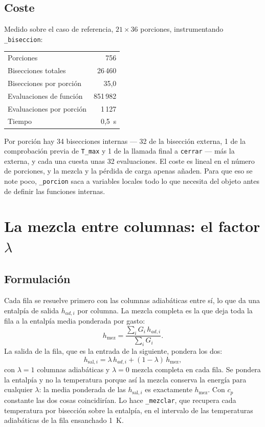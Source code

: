 \documentclass[11pt,a4paper]{article}
\begin{document}
\subsection{Coste}
\label{sec:coste}

Medido sobre el caso de referencia, $21\times36$ porciones, instrumentando
\texttt{\_biseccion}:

\begin{center}
\begin{tabular}{lr}
  \toprule
  Porciones                                  & 756 \\
  Bisecciones totales                        & 26\,460 \\
  Bisecciones por porción                    & 35,0 \\
  Evaluaciones de función                    & 851\,982 \\
  Evaluaciones por porción                   & 1\,127 \\
  Tiempo                                     & 0,5~s \\
  \bottomrule
\end{tabular}
\end{center}

Por porción hay 34 bisecciones internas --- 32 de la bisección externa, 1 de la
comprobación previa de \texttt{T\_max} y 1 de la llamada final a \texttt{cerrar}
--- más la externa, y cada una cuesta unas 32 evaluaciones. El coste es lineal
en el número de porciones, y la mezcla y la pérdida de carga apenas añaden. Para
que eso se note poco, \texttt{\_porcion} saca a variables locales todo lo que
necesita del objeto antes de definir las funciones internas.

\section{La mezcla entre columnas: el factor \texorpdfstring{$\lambda$}{lambda}}
\label{sec:mezcla}

\subsection{Formulación}

Cada fila se resuelve primero con las columnas adiabáticas entre sí, lo que da
una entalpía de salida $h_{ad,i}$ por columna. La mezcla completa es la que deja
toda la fila a la entalpía media ponderada por gasto:
\[
  h_{\mathrm{mez}} = \frac{\sum_i G_i\,h_{ad,i}}{\sum_i G_i}.
\]
La salida de la fila, que es la entrada de la siguiente, pondera los dos:
\[
  h_{\mathrm{sal},i} = \lambda\,h_{ad,i} + (1 - \lambda)\,h_{\mathrm{mez}},
\]
con $\lambda = 1$ columnas adiabáticas y $\lambda = 0$ mezcla completa en cada
fila. Se pondera la entalpía y no la temperatura porque así la mezcla conserva la
energía para cualquier $\lambda$: la media ponderada de las $h_{\mathrm{sal},i}$
es exactamente $h_{\mathrm{mez}}$. Con $c_p$ constante las dos cosas
coincidirían. Lo hace \texttt{\_mezclar}, que recupera cada temperatura por
bisección sobre la entalpía, en el intervalo de las temperaturas adiabáticas de
la fila ensanchado 1~K.
\end{document}
